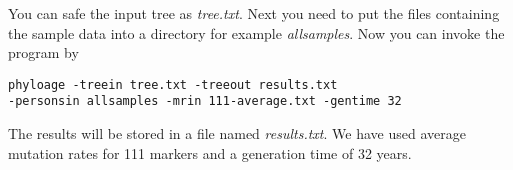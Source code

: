 You can safe the input tree as \emph{tree.txt}. Next you need to
put the files containing the sample data into a directory for
example \emph{allsamples}. Now you can invoke the program by

\vspace{1em}
\noindent
\texttt{phyloage -treein tree.txt -treeout results.txt\\
-personsin allsamples -mrin 111-average.txt -gentime 32}
\vspace{1em}

\noindent The results will be stored in a file named \emph{results.txt}.
We have used average mutation rates for 111 markers and a
generation time of 32 years.












